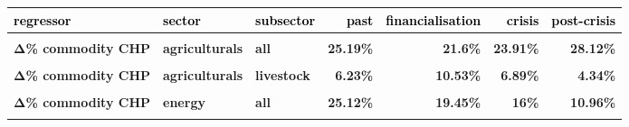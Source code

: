 \documentclass[
  authoryear,
  preprint,
  3p]{elsarticle}
\begin{document}
\begin{longtable}[t]{>{}l>{}l>{}l>{}r>{}r>{}r>{}r}
\toprule
\textcolor{black}{\textbf{regressor}} & \textcolor{black}{\textbf{sector}} & \textcolor{black}{\textbf{subsector}} & \textcolor{black}{\textbf{past}} & \textcolor{black}{\textbf{financialisation}} & \textcolor{black}{\textbf{crisis}} & \textcolor{black}{\textbf{post-crisis}}\\
\midrule
\textbf{\cellcolor{gray!10}{Δ\% commodity CHP}} & \textbf{\cellcolor{gray!10}{all}} & \textbf{\cellcolor{gray!10}{all}} & \textcolor[HTML]{4285f4}{\textbf{\cellcolor{gray!10}{25.79\%}}} & \textcolor[HTML]{4285f4}{\textbf{\cellcolor{gray!10}{20.72\%}}} & \textcolor[HTML]{4285f4}{\textbf{\cellcolor{gray!10}{22.46\%}}} & \textcolor[HTML]{4285f4}{\textbf{\cellcolor{gray!10}{27.17\%}}}\\
\textbf{Δ\% commodity CHP} & \textbf{agriculturals} & \textbf{all} & \textcolor[HTML]{4285f4}{\textbf{25.19\%}} & \textcolor[HTML]{4285f4}{\textbf{21.6\%}} & \textcolor[HTML]{4285f4}{\textbf{23.91\%}} & \textcolor[HTML]{4285f4}{\textbf{28.12\%}}\\
\textbf{\cellcolor{gray!10}{Δ\% commodity CHP}} & \textbf{\cellcolor{gray!10}{agriculturals}} & \textbf{\cellcolor{gray!10}{grains}} & \textcolor[HTML]{4285f4}{\textbf{\cellcolor{gray!10}{33.18\%}}} & \textcolor[HTML]{4285f4}{\textbf{\cellcolor{gray!10}{27.86\%}}} & \textcolor[HTML]{4285f4}{\textbf{\cellcolor{gray!10}{29.15\%}}} & \textcolor[HTML]{4285f4}{\textbf{\cellcolor{gray!10}{36.24\%}}}\\
\textbf{Δ\% commodity CHP} & \textbf{agriculturals} & \textbf{livestock} & \textcolor[HTML]{4285f4}{\textbf{6.23\%}} & \textcolor[HTML]{4285f4}{\textbf{10.53\%}} & \textcolor[HTML]{4285f4}{\textbf{6.89\%}} & \textcolor[HTML]{4285f4}{\textbf{4.34\%}}\\
\textbf{\cellcolor{gray!10}{Δ\% commodity CHP}} & \textbf{\cellcolor{gray!10}{agriculturals}} & \textbf{\cellcolor{gray!10}{softs}} & \textcolor[HTML]{4285f4}{\textbf{\cellcolor{gray!10}{26.68\%}}} & \textcolor[HTML]{4285f4}{\textbf{\cellcolor{gray!10}{20.89\%}}} & \textcolor[HTML]{4285f4}{\textbf{\cellcolor{gray!10}{27.19\%}}} & \textcolor[HTML]{4285f4}{\textbf{\cellcolor{gray!10}{31.88\%}}}\\
\addlinespace
\textbf{Δ\% commodity CHP} & \textbf{energy} & \textbf{all} & \textcolor[HTML]{4285f4}{\textbf{25.12\%}} & \textcolor[HTML]{4285f4}{\textbf{19.45\%}} & \textcolor[HTML]{4285f4}{\textbf{16\%}} & \textcolor[HTML]{4285f4}{\textbf{10.96\%}}\\
\textbf{\cellcolor{gray!10}{Δ\% commodity CHP}} & \textbf{\cellcolor{gray!10}{energy}} & \textbf{\cellcolor{gray!10}{gas}} & \textcolor[HTML]{4285f4}{\textbf{\cellcolor{gray!10}{19.69\%}}} & \textcolor[HTML]{4285f4}{\textbf{\cellcolor{gray!10}{15.65\%}}} & \textcolor[HTML]{4285f4}{\textbf{\cellcolor{gray!10}{7.36\%}}} & \textcolor[HTML]{4285f4}{\textbf{\cellcolor{gray!10}{5.29\%}}}\\

\end{longtable}
\end{document}
